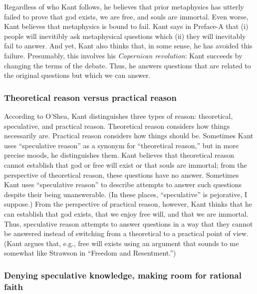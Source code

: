 \documentclass[12pt,letterpaper]{article}
\begin{document}
Regardless of who Kant follows, he believes that prior metaphysics has utterly failed to prove that god exists, we are free, and souls are immortal.
Even worse, Kant believes that metaphysics is bound to fail.
Kant says in Preface-A that (i) people will inevitibly ask metaphysical questions which (ii) they will inevitably fail to answer.
And yet, Kant also thinks that, in some sense, he has avoided this failure.
Presumably, this involves his \textit{Copernican revolution}: Kant succeeds by changing the terms of the debate.
Thus, he answers questions that are related to the original questions but which we can answer.

\subsubsection*{Theoretical reason versus practical reason}

According to O'Shea, Kant distinguishes three types of reason: theoretical, speculative, and practical reason.
Theoretical reason considers how things necessarily are.
Practical reason considers how things should be.
Sometimes Kant uses ``speculative reason'' as a synonym for ``theoretical reason,'' but in more precise moods, he distinguishes them.
Kant believes that theoretical reason cannot establish that god or free will exist or that souls are immortal; from the perspective of theoretical reason, these questions have no answer.
Sometimes Kant uses ``speculative reason'' to describe attempts to answer such questions despite their being unanswerable.
(In these places, ``speculative'' is pejorative, I suppose.)
From the perspective of practical reason, however, Kant thinks that he can establish that god exists, that we enjoy free will, and that we are immortal.
Thus, speculative reason attempts to answer questions in a way that they cannot be answered instead of switching from a theoretical to a practical point of view.
(Kant argues that, e.g., free will exists using an argument that sounds to me somewhat like Strawson in ``Freedom and Resentment.'')

\subsubsection*{Denying speculative knowledge, making room for rational faith}
\end{document}

